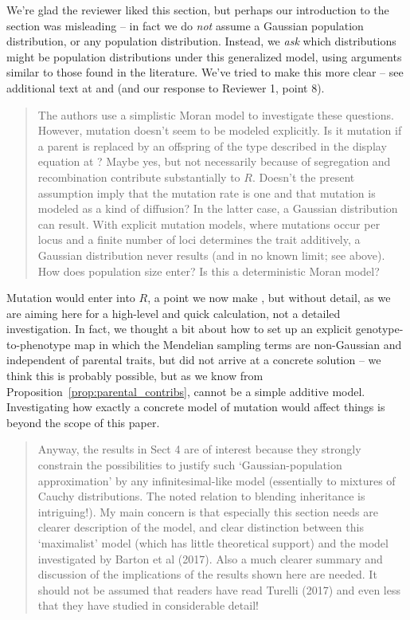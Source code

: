 We're glad the reviewer liked this section,
but perhaps our introduction to the section was misleading --
in fact we do \emph{not} assume a Gaussian population distribution,
or any population distribution.
Instead, we \emph{ask} which distributions might be population distributions
under this generalized model,
using arguments similar to those found in the literature.
We've tried to make this more clear -- see additional text at 
and 
(and our response to Reviewer 1, point 8).

\begin{quote}
The authors use a simplistic Moran model to investigate these questions. However, mutation 
doesn’t seem to be modeled explicitly. Is it mutation if a parent is replaced by an
offspring of the type described in the display equation at ?
Maybe yes, but not necessarily because of segregation and recombination contribute substantially to $R$.
Doesn’t the present assumption imply that the mutation rate is one and that mutation is modeled as a
kind of diffusion? In the latter case, a Gaussian distribution can result. With explicit
mutation models, where mutations occur per locus and a finite number of loci determines the
trait additively, a Gaussian distribution never results (and in no known limit; see above).
How does population size enter? Is this a deterministic Moran model?
\end{quote}

Mutation would enter into $R$, a point we now make ,
but without detail, as we are aiming here for a high-level and quick calculation,
not a detailed investigation.
In fact, we thought a bit about how to set up an explicit genotype-to-phenotype map
in which the Mendelian sampling terms are non-Gaussian and independent of parental traits,
but did not arrive at a concrete solution --
we think this is probably possible,
but as we know from Proposition~\ref{prop:parental_contribs},
cannot be a simple additive model.
Investigating how exactly a concrete model of mutation would affect things is beyond the scope of this paper.

\begin{quote}
Anyway, the results
in Sect 4 are of interest because they strongly constrain the possibilities to justify such
‘Gaussian-population approximation’ by any infinitesimal-like model (essentially to
mixtures of Cauchy distributions. The noted relation to blending inheritance is intriguing!).
My main concern is that especially this section needs are clearer description of the model,
and clear distinction between this ‘maximalist’ model (which has little theoretical
support) and the model investigated by Barton et al (2017). Also a much clearer summary
and discussion of the implications of the results shown here are needed. It should not be
assumed that readers have read Turelli (2017) and even less that they have studied
\citet{barton2017infinitesimal} in considerable detail!
\end{quote}

